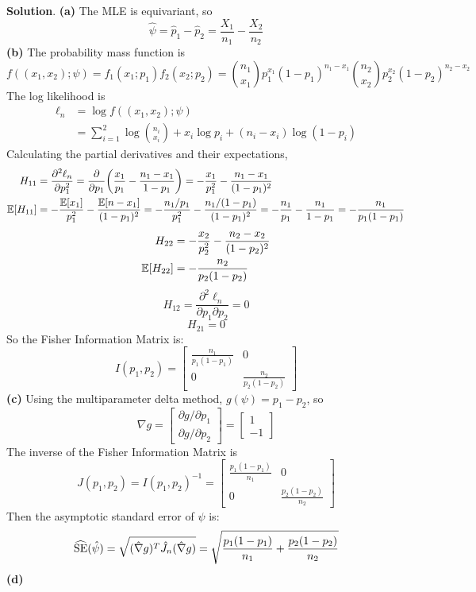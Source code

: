 \textbf{Solution}.
\textbf{(a)} The MLE is equivariant, so
\[
\hat{\psi} = \hat{p}_{1} - \hat{p}_{2} = \frac{X_{1}}{n_{1}} - \frac{X_{2}}{n_{2}}
\]
\textbf{(b)}
The probability mass function is
\[
f((x_{1}, x_{2}); \psi) = f_{1}(x_{1}; p_{1}) f_{2}(x_{2}; p_{2}) = 
\binom{n_{1}}{x_{1}} p_{1}^{x_{1}} (1 - p_{1})^{n_{1} - x_{1}}
\binom{n_{2}}{x_{2}} p_{2}^{x_{2}} (1 - p_{2})^{n_{2} - x_{2}}
\]
The log likelihood is
\begin{align*}
\ell_{n} &= \log f((x_{1}, x_{2}); \psi) 
\\
&= \sum_{i=1}^{2} \log \binom{n_{i}}{x_{i}} + x_{i} \log p_{i} + (n_{i} - x_{i}) \log (1 - p_{i})
\end{align*}
Calculating the partial derivatives and their expectations,
\begin{align*}
H_{11} & = \frac{\partial^{2} \ell_{n}}{\partial p_{1}^{2}}
= \frac{\partial}{\partial p_{1}} \left( \frac{x_{1}}{p_{1}} - \frac{n_{1} - x_{1}}{1 - p_{1}}\right)
= -\frac{x_{1}}{p_{1}^{2}} - \frac{n_{1} - x_{1}}{(1 - p_{1})^{2}} \\
\EXP[H_{11}] &= -\frac{\EXP[x_{1}]}{p_{1}^{2}} - \frac{\EXP[n - x_{1}]}{(1 - p_{1})^{2}}
= -\frac{n_{1} / p_{1}}{p_{1}^{2}} - \frac{n_{1}/(1 - p_{1})}{(1 - p_{1})^{2}}
= -\frac{n_{1}}{p_{1}} - \frac{n_{1}}{1 - p_{1}} = -\frac{n_{1}}{p_{1}(1 - p_{1})}
\end{align*}
\begin{align*}
H_{22} &= -\frac{x_{2}}{p_{2}^{2}} - \frac{n_{2} - x_{2}}{(1 - p_{2})^{2}} \\
\operatorname{\mathbb{E}}[H_{22}] &= -\frac{n_{2}}{p_{2}(1 - p_{2})}
\end{align*}
\[
H_{12} = \frac{\partial^{2} \ell_{n}}{\partial p_{1} \partial p_{2}} = 0
\]
\[
H_{21} = 0
\]
So the Fisher Information Matrix is:
\[
I(p_{1}, p_{2}) = \begin{bmatrix}
\frac{n_{1}}{p_{1}(1 - p_{1})} & 0\\
0 & \frac{n_{2}}{p_{2}(1 - p_{2})}
\end{bmatrix}
\]
\textbf{(c)} Using the multiparameter delta method,
\(g(\psi) = p_{1} - p_{2}\), so
\[
\nabla g = \begin{bmatrix}
\partial g / \partial p_{1} \\ \partial g / \partial p_{2}
\end{bmatrix}
= \begin{bmatrix}
1 \\ -1
\end{bmatrix}
\]
The inverse of the Fisher Information Matrix is
\[
J(p_{1}, p_{2}) = I(p_{1}, p_{2})^{-1} = \begin{bmatrix}
\frac{p_{1}(1 - p_{1})}{n_{1}} & 0 \\
0 & \frac{p_{2}(1 - p_{2})}{n_{2}}
\end{bmatrix}
\]
Then the asymptotic standard error of \(\hat{\psi}\) is:
\[
\widehat{\operatorname{\mathrm{SE}}}(\hat{\psi}) = \sqrt{(\hat{\nabla} g)^T \hat{J}_{n} (\hat{\nabla} g)}
= \sqrt{\frac{p_{1}(1 - p_{1})}{n_{1}} + \frac{p_{2}(1 - p_{2})}{n_{2}}}
\]
\textbf{(d)}

